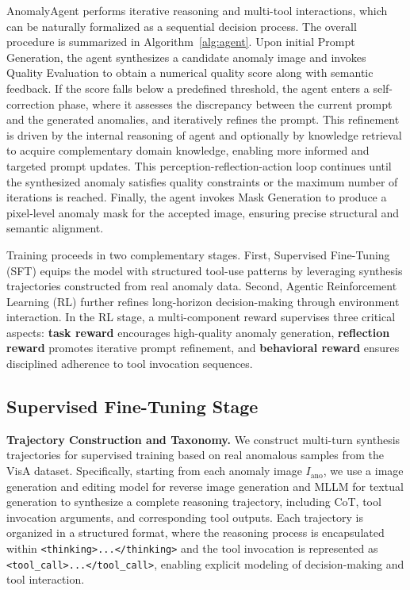 \documentclass[sigconf]{acmart}
\begin{document}
AnomalyAgent performs iterative reasoning and multi-tool interactions, which can be naturally formalized as a sequential decision process. The overall procedure is summarized in Algorithm~\ref{alg:agent}. Upon initial Prompt Generation, the agent synthesizes a candidate anomaly image and invokes Quality Evaluation to obtain a numerical quality score along with semantic feedback. If the score falls below a predefined threshold, the agent enters a self-correction phase, where it assesses the discrepancy between the current prompt and the generated anomalies, and iteratively refines the prompt. This refinement is driven by the internal reasoning of agent and optionally by knowledge retrieval to acquire complementary domain knowledge, enabling more informed and targeted prompt updates. This perception-reflection-action loop continues until the synthesized anomaly satisfies quality constraints or the maximum number of iterations is reached. Finally, the agent invokes Mask Generation to produce a pixel-level anomaly mask for the accepted image, ensuring precise structural and semantic alignment.

Training proceeds in two complementary stages. First, Supervised Fine-Tuning (SFT) equips the model with structured tool-use patterns by leveraging synthesis trajectories constructed from real anomaly data. Second, Agentic Reinforcement Learning (RL) further refines long-horizon decision-making through environment interaction. In the RL stage, a multi-component reward supervises three critical aspects: \textbf{task reward} encourages high-quality anomaly generation, \textbf{reflection reward} promotes iterative prompt refinement, and \textbf{behavioral reward} ensures disciplined adherence to tool invocation sequences.

\subsection{Supervised Fine-Tuning Stage}

\textbf{Trajectory Construction and Taxonomy.}
We construct multi-turn synthesis trajectories for supervised training based on real anomalous samples from the VisA\cite{DBLP:conf/eccv/ZouJPZD22} dataset. Specifically, starting from each anomaly image $I_{\text{ano}}$, we use a image generation and editing model for reverse image generation and MLLM for textual generation to synthesize a complete reasoning trajectory, including CoT, tool invocation arguments, and corresponding tool outputs. Each trajectory is organized in a structured format, where the reasoning process is encapsulated within \texttt{<thinking>...</thinking>} and the tool invocation is represented as \texttt{<tool\_call>...</tool\_call>}, enabling explicit modeling of decision-making and tool interaction.
\end{document}
